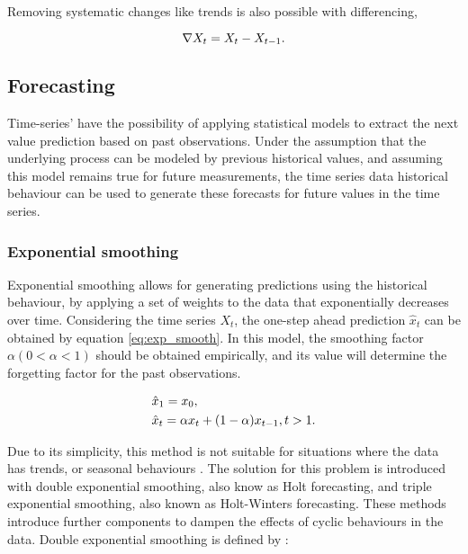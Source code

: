 Removing systematic changes like trends is also possible with differencing,

\begin {equation*}
\centering
\nabla X_t = X_t - X_{t-1}.
\end {equation*}

\subsection{Forecasting} \label{sec:forecasting}

Time-series' have the possibility of applying statistical models to extract the next value prediction based on past observations. Under the assumption that the
underlying process can be modeled by previous historical values, and assuming this model remains true for future measurements, the time series data historical 
behaviour can be used to generate these forecasts for future values in the time series. 

\subsubsection{Exponential smoothing}

\par Exponential smoothing allows for generating predictions using the historical behaviour, by applying a set of weights to the data that exponentially decreases 
over time. Considering the time series $X_t$, the one-step ahead prediction $\hat{x}_t$ can be obtained by equation \ref{eq:exp_smooth}.  In this model, the 
smoothing factor $\alpha (0 < \alpha < 1)$ should be obtained empirically, and its value will determine the forgetting factor for the past observations.

\begin {equation*}
    \centering
        \begin {split}
            &\hat{x}_1 = x_0, \\
            &\hat{x}_t = \alpha x_{t} + (1-\alpha)x_{t-1}, t > 1.
        \end {split}
    \label{eq:exp_smooth}
\end {equation*}

\par Due to its simplicity, this method is not suitable for situations where the data has trends, or seasonal behaviours \cite{kalekar_time_2004}. The solution for
this problem is introduced with double exponential smoothing, also know as Holt forecasting, and triple exponential smoothing, also known as Holt-Winters
forecasting. These methods introduce further components to dampen the effects of cyclic behaviours in the data. Double exponential smoothing is defined by
\cite{munz_traffic_2010} :

